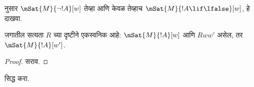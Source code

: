 \documentclass[../../../include/open-logic-section]{subfiles}
\begin{document}
\begin{prob}
   नुसार
  $\mSat{M}{\lnot !A}[w]$ तेव्हा आणि केवळ तेव्हाच
  $\mSat{M}{!A \lif \lfalse}[w]$, हे दाखवा.
\end{prob}

\begin{prop}
  जगातील सत्यता $R$ च्या दृष्टीने एकस्वनिक आहे:
  $\mSat{M}{!A}[w]$ आणि $Rww'$ असेल, तर
  $\mSat{M}{!A}[w']$.
\end{prop}

\begin{proof}
  सराव.
\end{proof}

\begin{prob}
   सिद्ध करा.
\end{prob}
\end{document}
